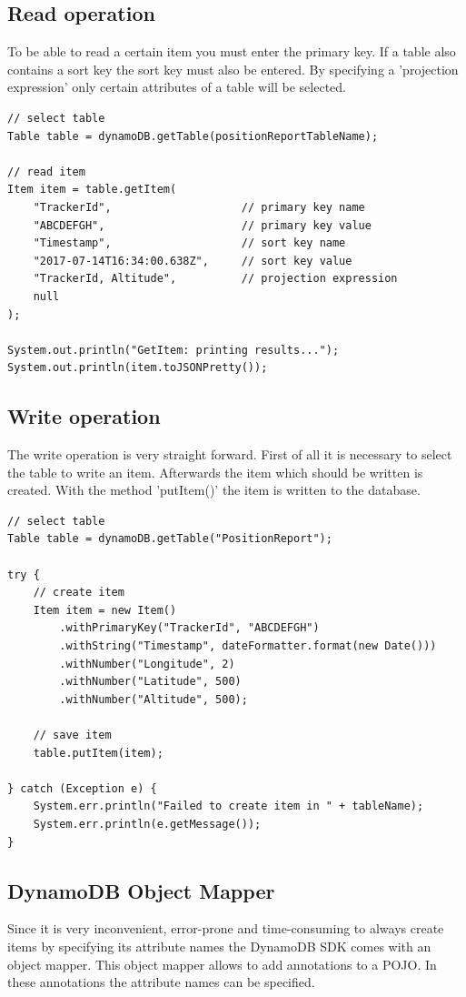 \subsection{Read operation}
To be able to read a certain item you must enter the primary key. If a table also contains a sort key the sort key must also be entered. By specifying a 'projection expression' only certain attributes of a table will be selected.
\begin{lstlisting}
// select table
Table table = dynamoDB.getTable(positionReportTableName);

// read item
Item item = table.getItem(
	"TrackerId",                    // primary key name
    "ABCDEFGH",                     // primary key value
    "Timestamp",                    // sort key name
    "2017-07-14T16:34:00.638Z",     // sort key value
    "TrackerId, Altitude",     		// projection expression
    null
);

System.out.println("GetItem: printing results...");
System.out.println(item.toJSONPretty());
\end{lstlisting}

\subsection{Write operation}
The write operation is very straight forward. First of all it is necessary to select the table to write an item. Afterwards the item which should be written is created. With the method 'putItem()' the item is written to the database.
\begin{lstlisting}
// select table
Table table = dynamoDB.getTable("PositionReport");

try {
    // create item
    Item item = new Item()
        .withPrimaryKey("TrackerId", "ABCDEFGH")
        .withString("Timestamp", dateFormatter.format(new Date()))
        .withNumber("Longitude", 2)
    	.withNumber("Latitude", 500)
	    .withNumber("Altitude", 500);

	// save item
	table.putItem(item);

} catch (Exception e) {
	System.err.println("Failed to create item in " + tableName);
	System.err.println(e.getMessage());
}
\end{lstlisting}

\subsection{DynamoDB Object Mapper}
Since it is very inconvenient, error-prone and time-consuming to always create items by specifying its attribute names the DynamoDB SDK comes with an object mapper. This object mapper allows to add annotations to a POJO. In these annotations the attribute names can be specified.

